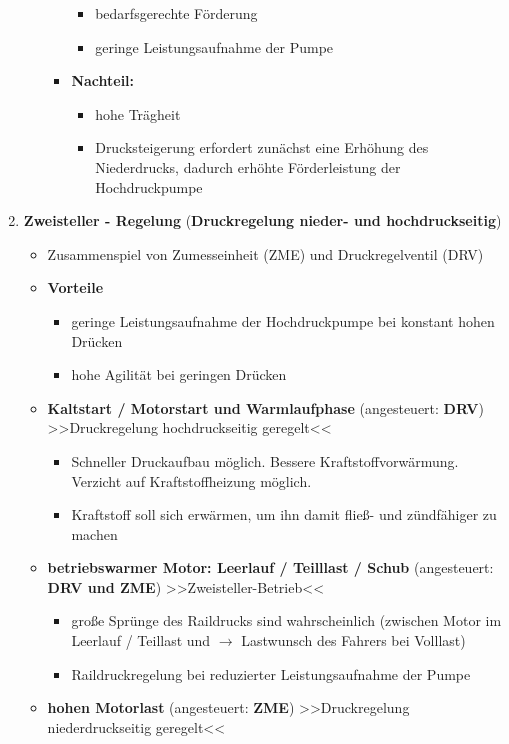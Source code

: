 \begin{enumerate}
\begin{itemize}
\begin{itemize}
      \begin{itemize}
      \item
        bedarfsgerechte Förderung
      \item
        geringe Leistungsaufnahme der Pumpe
      \end{itemize}
    \item
      \textbf{Nachteil:}

      \begin{itemize}
      \item
        hohe Trägheit
      \item
        Drucksteigerung erfordert zunächst eine Erhöhung des
        Niederdrucks, dadurch erhöhte Förderleistung der Hochdruckpumpe
      \end{itemize}
    \end{itemize}
  \end{itemize}
\item
  \textbf{Zweisteller - Regelung} (\textbf{Druckregelung nieder- und
  hochdruckseitig})

  \begin{itemize}
  \item
    Zusammenspiel von Zumesseinheit (ZME) und Druckregelventil (DRV)
  \item
    \textbf{Vorteile}

    \begin{itemize}
    \item
      geringe Leistungsaufnahme der Hochdruckpumpe bei konstant hohen
      Drücken
    \item
      hohe Agilität bei geringen Drücken
    \end{itemize}
  \item
    \textbf{Kaltstart / Motorstart und Warmlaufphase} (angesteuert:
    \textbf{DRV}) >>Druckregelung hochdruckseitig geregelt<<

    \begin{itemize}
    \item
      Schneller Druckaufbau möglich. Bessere Kraftstoffvorwärmung.
      Verzicht auf Kraftstoffheizung möglich.
    \item
      Kraftstoff soll sich erwärmen, um ihn damit fließ- und zündfähiger
      zu machen
    \end{itemize}
  \item
    \textbf{betriebswarmer Motor: Leerlauf / Teilllast / Schub}
    (angesteuert: \textbf{DRV und ZME}) >>Zweisteller-Betrieb<<

    \begin{itemize}
    \item
      große Sprünge des Raildrucks sind wahrscheinlich (zwischen Motor
      im Leerlauf / Teillast und $\to$ Lastwunsch des Fahrers bei
      Volllast)
    \item
      Raildruckregelung bei reduzierter Leistungsaufnahme der Pumpe
    \end{itemize}
  \item
    \textbf{hohen Motorlast} (angesteuert: \textbf{ZME}) >>Druckregelung
    niederdruckseitig geregelt<<


\end{itemize}
\end{enumerate}

